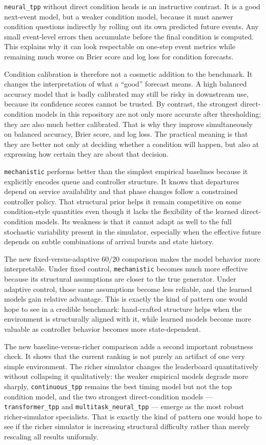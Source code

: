 \documentclass[11pt]{article}
\begin{document}
\texttt{neural\_tpp} without direct condition heads is an instructive contrast. It is a good next-event model, but a weaker condition model, because it must answer condition questions indirectly by rolling out its own predicted future events. Any small event-level errors then accumulate before the final condition is computed. This explains why it can look respectable on one-step event metrics while remaining much worse on Brier score and log loss for condition forecasts.

Condition calibration is therefore not a cosmetic addition to the benchmark. It changes the interpretation of what a ``good'' forecast means. A high balanced accuracy model that is badly calibrated may still be risky in downstream use, because its confidence scores cannot be trusted. By contrast, the strongest direct-condition models in this repository are not only more accurate after thresholding; they are also much better calibrated. That is why they improve simultaneously on balanced accuracy, Brier score, and log loss. The practical meaning is that they are better not only at deciding whether a condition will happen, but also at expressing how certain they are about that decision.

\texttt{mechanistic} performs better than the simplest empirical baselines because it explicitly encodes queue and controller structure. It knows that departures depend on service availability and that phase changes follow a constrained controller policy. That structural prior helps it remain competitive on some condition-style quantities even though it lacks the flexibility of the learned direct-condition models. Its weakness is that it cannot adapt as well to the full stochastic variability present in the simulator, especially when the effective future depends on subtle combinations of arrival bursts and state history.

The new fixed-versus-adaptive \(60/20\) comparison makes the model behavior more interpretable. Under fixed control, \texttt{mechanistic} becomes much more effective because its structural assumptions are closer to the true generator. Under adaptive control, those same assumptions become less reliable, and the learned models gain relative advantage. This is exactly the kind of pattern one would hope to see in a credible benchmark: hand-crafted structure helps when the environment is structurally aligned with it, while learned models become more valuable as controller behavior becomes more state-dependent.

The new baseline-versus-richer comparison adds a second important robustness check. It shows that the current ranking is not purely an artifact of one very simple environment. The richer simulator changes the leaderboard quantitatively without collapsing it qualitatively: the weaker empirical models degrade more sharply, \texttt{continuous\_tpp} remains the best timing model but not the top condition model, and the two strongest direct-condition models --- \texttt{transformer\_tpp} and \texttt{multitask\_neural\_tpp} --- emerge as the most robust richer-simulator specialists. That is exactly the kind of pattern one would hope to see if the richer simulator is increasing structural difficulty rather than merely rescaling all results uniformly.
\end{document}
